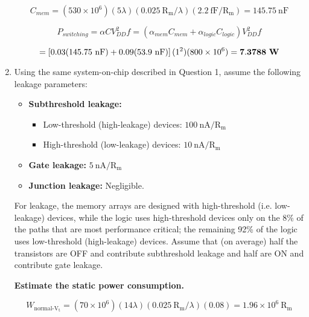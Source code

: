\documentclass[fleqn]{article}
\begin{document}
\begin{enumerate}
		\begin{equation*}
			C_{mem} = (530 \times 10^6)(5\lambda)(0.025\ \text{R}_\text{m}/\lambda)(2.2\ \text{fF}/\text{R}_\text{m}) = 145.75\ \text{nF}
		\end{equation*}
		
		\begin{equation*}
			P_{switching} = {\alpha}CV_{DD}^2f = ({\alpha_{mem}}C_{mem} + {\alpha_{logic}}C_{logic})V_{DD}^2f
		\end{equation*}
		
		\begin{equation*}
			= \left[0.03(145.75\ \text{nF}) + 0.09(53.9\ \text{nF})\right](1^2)(800 \times 10^6) = \mathbf{7.3788}\ \text{\textbf{W}}
		\end{equation*}
		
		\item Using the same system-on-chip described in Question 1, assume the following leakage parameters:
		
		\begin{itemize}
			\item \textbf{Subthreshold leakage:}
				\begin{itemize}[label={--}]
					\item Low-threshold (high-leakage) devices: $100\ \text{nA}/\text{R}_\text{m}$
					\item High-threshold (low-leakage) devices: $10\ \text{nA}/\text{R}_\text{m}$
				\end{itemize}
			\item \textbf{Gate leakage:} $5\ \text{nA}/\text{R}_\text{m}$
			\item \textbf{Junction leakage:} Negligible.
		\end{itemize}
		
		For leakage, the memory arrays are designed with high-threshold (i.e. low-leakage) devices, while the logic uses high-threshold devices only on the 8\% of the paths that are most performance critical; the remaining 92\% of the logic uses low-threshold (high-leakage) devices. Assume that (on average) half the transistors are OFF and contribute subthreshold leakage and half are ON and contribute gate leakage.

		\textbf{Estimate the static power consumption.}
		
		\begin{equation*}
			W_{\text{normal-V}_\text{t}} = (70 \times 10^6)(14\lambda)(0.025\ \text{R}_\text{m}/\lambda)(0.08) = 1.96 \times 10^6\ \text{R}_\text{m}
		\end{equation*}
		

\end{enumerate}
\end{document}
